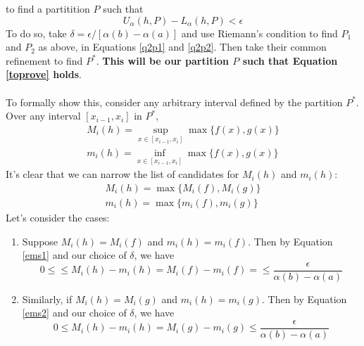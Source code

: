 \documentclass[12pt]{article}
\theoremstyle{plain}
\theoremstyle{definition}
\theoremstyle{remark}
\begin{document}
\begin{enumerate}
\begin{enumerate}
            to find a partitition $P$ such that 
            \begin{equation}
                \label{toprove}
                U_\alpha(h,P) - L_\alpha(h,P) < \epsilon
            \end{equation}
            To do so, take $\delta = 
            \epsilon/[\alpha(b)-\alpha(a)]$ and use 
            Riemann's condition to find $P_1$ and $P_2$ 
            as above, in Equations \ref{q2p1} and \ref{q2p2}.
            Then take their common refinement to find $P^*$. 
            \textbf{This will be our partition $P$ such that 
            Equation \ref{toprove} holds}.
            \\
            \\
            To formally show this, consider any arbitrary 
            interval defined by the partition $P^*$. Over any 
            interval $[x_{i-1}, x_i]$ in $P^*$, 
            \begin{align*}
                M_i(h) = \sup_{x\in[x_{i-1}, x_i]} 
                    \max\{f(x), g(x)\} \\
                m_i(h) = \inf_{x\in[x_{i-1}, x_i]} 
                    \max\{f(x), g(x)\} 
            \end{align*}
            It's clear that we can narrow the list of 
            candidates for $M_i(h)$ and $m_i(h)$:
            \begin{align*}
                M_i(h) =  \max\{M_i(f), M_i(g)\} \\
                m_i(h) = \max\{m_i(f), m_i(g)\} 
            \end{align*}
            Let's consider the cases:
            \begin{enumerate}
                \item Suppose $M_i(h) = M_i(f)$ and
                    $m_i(h) = m_i(f)$. Then by Equation
                    \ref{ems1} and our choice of $\delta$,
                    we have
                    \[ 0  \leq \leq M_i(h) - m_i(h) =
                        M_i(f) - m_i(f)  =
                        \leq\frac{\epsilon}{\alpha(b)-\alpha(a)}
                        \]
                \item Similarly, if $M_i(h) = M_i(g)$ and
                    $m_i(h) = m_i(g)$. Then by Equation
                    \ref{ems2} and our choice of $\delta$,
                    we have
                    \[ 0 \leq
                        M_i(h) - m_i(h) =  M_i(g) - m_i(g) 
                        \leq\frac{\epsilon}{\alpha(b)-\alpha(a)}
                        \]

\end{enumerate}
\end{enumerate}
\end{enumerate}
\end{document}
